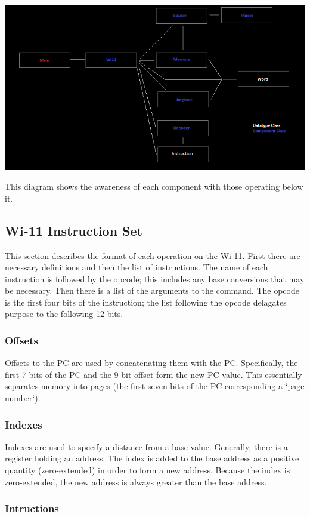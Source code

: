 \begin{DoxyImage}
\includegraphics[width=\textwidth]{software_interaction.png}
\caption{This diagram shows the awareness of each component with those operating below it.}
\end{DoxyImage}
\hypertarget{index_instructions}{}\subsection{Wi-\/11 Instruction Set}\label{index_instructions}
\begin{DoxyParagraph}{}
This section describes the format of each operation on the Wi-\/11. First there are necessary definitions and then the list of instructions. The name of each instruction is followed by the opcode; this includes any base conversions that may be necessary. Then there is a list of the arguments to the command. The opcode is the first four bits of the instruction; the list following the opcode delagates purpose to the following 12 bits.
\end{DoxyParagraph}
\hypertarget{index_offset}{}\subsubsection{Offsets}\label{index_offset}
Offsets to the PC are used by concatenating them with the PC. Specifically, the first 7 bits of the PC and the 9 bit offset form the new PC value. This essentially separates memory into pages (the first seven bits of the PC corresponding a \char`\"{}page number\char`\"{}).\hypertarget{index_indexes}{}\subsubsection{Indexes}\label{index_indexes}
Indexes are used to specify a distance from a base value. Generally, there is a register holding an address. The index is added to the base address as a positive quantity (zero-\/extended) in order to form a new address. Because the index is zero-\/extended, the new address is always greater than the base address.\hypertarget{index_inst}{}\subsubsection{Intructions}\label{index_inst}
